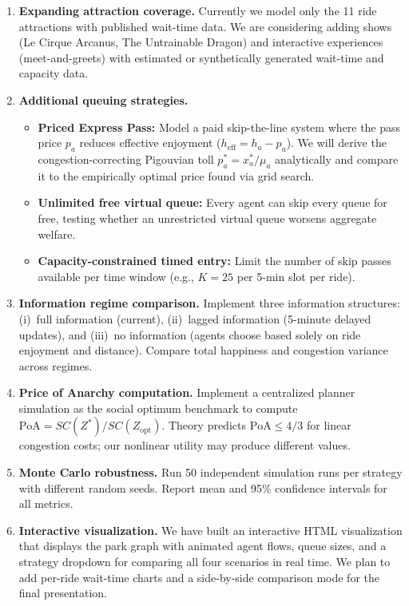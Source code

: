 \documentclass[11pt]{article}
\begin{document}
\begin{enumerate}
    \item \textbf{Expanding attraction coverage.} Currently we model only the 11 ride attractions with published wait-time data. We are considering adding shows (Le Cirque Arcanus, The Untrainable Dragon) and interactive experiences (meet-and-greets) with estimated or synthetically generated wait-time and capacity data.

    \item \textbf{Additional queuing strategies.}
    \begin{itemize}[nosep]
        \item \textbf{Priced Express Pass:} Model a paid skip-the-line system where the pass price $p_a$ reduces effective enjoyment ($h_{\text{eff}} = h_a - p_a$). We will derive the congestion-correcting Pigouvian toll $p_a^* = x_a^* / \mu_a$ analytically and compare it to the empirically optimal price found via grid search.
        \item \textbf{Unlimited free virtual queue:} Every agent can skip every queue for free, testing whether an unrestricted virtual queue worsens aggregate welfare.
        \item \textbf{Capacity-constrained timed entry:} Limit the number of skip passes available per time window (e.g., $K = 25$ per 5-min slot per ride).
    \end{itemize}

    \item \textbf{Information regime comparison.} Implement three information structures: (i)~full information (current), (ii)~lagged information (5-minute delayed updates), and (iii)~no information (agents choose based solely on ride enjoyment and distance). Compare total happiness and congestion variance across regimes.

    \item \textbf{Price of Anarchy computation.} Implement a centralized planner simulation as the social optimum benchmark to compute $\text{PoA} = SC(Z^*) / SC(Z_{\text{opt}})$. Theory predicts $\text{PoA} \leq 4/3$ for linear congestion costs; our nonlinear utility may produce different values.

    \item \textbf{Monte Carlo robustness.} Run 50 independent simulation runs per strategy with different random seeds. Report mean and 95\% confidence intervals for all metrics.

    \item \textbf{Interactive visualization.} We have built an interactive HTML visualization that displays the park graph with animated agent flows, queue sizes, and a strategy dropdown for comparing all four scenarios in real time. We plan to add per-ride wait-time charts and a side-by-side comparison mode for the final presentation.
\end{enumerate}
\end{document}
